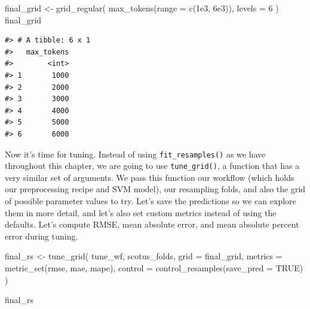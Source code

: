 \documentclass[
]{krantz}
\makeatletter
\newenvironment{Shaded}{\begin{snugshade}}{\end{snugshade}}
\newcommand{\AttributeTok}[1]{\textcolor[rgb]{0.77,0.63,0.00}{#1}}
\newcommand{\ConstantTok}[1]{\textcolor[rgb]{0.00,0.00,0.00}{#1}}
\newcommand{\DecValTok}[1]{\textcolor[rgb]{0.00,0.00,0.81}{#1}}
\newcommand{\FloatTok}[1]{\textcolor[rgb]{0.00,0.00,0.81}{#1}}
\newcommand{\FunctionTok}[1]{\textcolor[rgb]{0.00,0.00,0.00}{#1}}
\newcommand{\NormalTok}[1]{#1}
\newcommand{\OtherTok}[1]{\textcolor[rgb]{0.56,0.35,0.01}{#1}}
\newenvironment{kframe}{%
\medskip{}
\setlength{\fboxsep}{.8em}
 \def\at@end@of@kframe{}%
 \ifinner\ifhmode%
  \def\at@end@of@kframe{\end{minipage}}%
  \begin{minipage}{\columnwidth}%
 \fi\fi%
 \def\FrameCommand##1{\hskip\@totalleftmargin \hskip-\fboxsep
 \colorbox{shadecolor}{##1}\hskip-\fboxsep
     \hskip-\linewidth \hskip-\@totalleftmargin \hskip\columnwidth}%
 \MakeFramed {\advance\hsize-\width
   \@totalleftmargin\z@ \linewidth\hsize
   \@setminipage}}%
 {\par\unskip\endMakeFramed%
 \at@end@of@kframe}
\renewenvironment{Shaded}{\begin{kframe}}{\end{kframe}}
\makeatother
\begin{document}
\begin{Shaded}
\begin{Highlighting}[]
\NormalTok{final\_grid }\OtherTok{\textless{}{-}} \FunctionTok{grid\_regular}\NormalTok{(}
  \FunctionTok{max\_tokens}\NormalTok{(}\AttributeTok{range =} \FunctionTok{c}\NormalTok{(}\FloatTok{1e3}\NormalTok{, }\FloatTok{6e3}\NormalTok{)),}
  \AttributeTok{levels =} \DecValTok{6}
\NormalTok{)}
\NormalTok{final\_grid}
\end{Highlighting}
\end{Shaded}

\begin{verbatim}
#> # A tibble: 6 x 1
#>   max_tokens
#>        <int>
#> 1       1000
#> 2       2000
#> 3       3000
#> 4       4000
#> 5       5000
#> 6       6000
\end{verbatim}

Now it's time for tuning. Instead of using \texttt{fit\_resamples()} as we have throughout this chapter, we are going to use \texttt{tune\_grid()}, a function that has a very similar set of arguments. We pass this function our workflow (which holds our preprocessing recipe and SVM model), our resampling folds, and also the grid of possible parameter values to try. Let's save the predictions so we can explore them in more detail, and let's also set custom metrics instead of using the defaults. Let's compute RMSE, mean absolute error, and mean absolute percent error during tuning.

\begin{Shaded}
\begin{Highlighting}[]
\NormalTok{final\_rs }\OtherTok{\textless{}{-}} \FunctionTok{tune\_grid}\NormalTok{(}
\NormalTok{  tune\_wf,}
\NormalTok{  scotus\_folds,}
  \AttributeTok{grid =}\NormalTok{ final\_grid,}
  \AttributeTok{metrics =} \FunctionTok{metric\_set}\NormalTok{(rmse, mae, mape),}
  \AttributeTok{control =} \FunctionTok{control\_resamples}\NormalTok{(}\AttributeTok{save\_pred =} \ConstantTok{TRUE}\NormalTok{)}
\NormalTok{)}

\NormalTok{final\_rs}
\end{Highlighting}
\end{Shaded}
\end{document}

